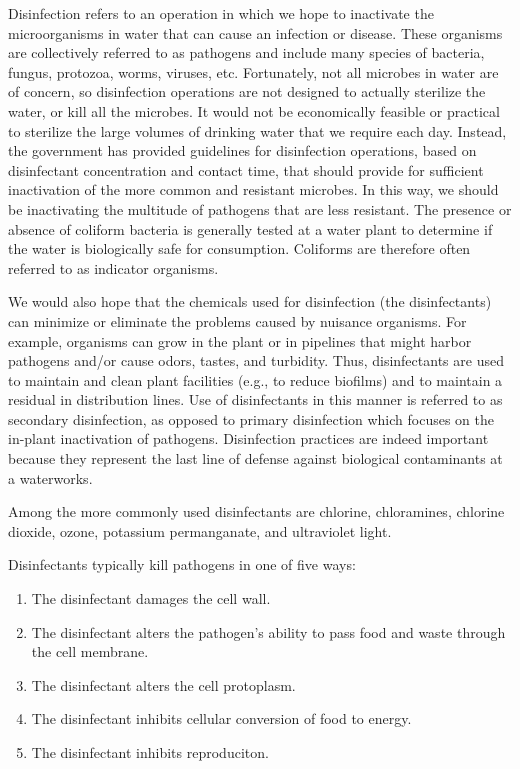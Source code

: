 \documentclass[10pt]{article}
\begin{document}
Disinfection refers to an operation in which we hope to inactivate the microorganisms in water that can cause an infection or disease. These organisms are collectively referred to as pathogens and include many species of bacteria, fungus, protozoa, worms, viruses, etc. Fortunately, not all microbes in water are of concern, so disinfection operations are not designed to actually sterilize the water, or kill all the microbes. It would not be economically feasible or practical to sterilize the large volumes of drinking water that we require each day. Instead, the government has provided guidelines for disinfection operations, based on disinfectant concentration and contact time, that should provide for sufficient inactivation of the more common and resistant microbes. In this way, we should be inactivating the multitude of pathogens that are less resistant. The presence or absence of coliform bacteria is generally tested at a water plant to determine if the water is biologically safe for consumption. Coliforms are therefore often referred to as indicator organisms.

We would also hope that the chemicals used for disinfection (the disinfectants) can minimize or eliminate the problems caused by nuisance organisms. For example, organisms can grow in the plant or in pipelines that might harbor pathogens and/or cause odors, tastes, and turbidity. Thus, disinfectants are used to maintain and clean plant facilities (e.g., to reduce biofilms) and to maintain a residual in distribution lines. Use of disinfectants in this manner is referred to as secondary disinfection, as opposed to primary disinfection which focuses on the in-plant inactivation of pathogens. Disinfection practices are indeed important because they represent the last line of defense against biological contaminants at a waterworks.

Among the more commonly used disinfectants are chlorine, chloramines, chlorine dioxide, ozone, potassium permanganate, and ultraviolet light.

Disinfectants typically kill pathogens in one of five ways:

\begin{enumerate}
  \item The disinfectant damages the cell wall.

  \item The disinfectant alters the pathogen's ability to pass food and waste through the cell membrane.

  \item The disinfectant alters the cell protoplasm.

  \item The disinfectant inhibits cellular conversion of food to energy.

  \item The disinfectant inhibits reproduciton.

\end{enumerate}
\end{document}
